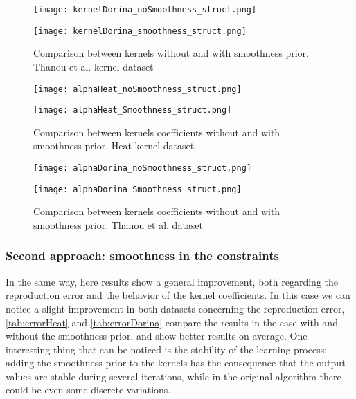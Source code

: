 \begin{figure}
  \begin{minipage}[c]{.5\textwidth}
    \centering
    \texttt{[image: kernelDorina\_noSmoothness\_struct.png]}
  \end{minipage}
  \begin{minipage}[c]{.5\textwidth}
    \centering
    \texttt{[image: kernelDorina\_smoothness\_struct.png]}
  \end{minipage}
  \caption{Comparison between kernels without and with smoothness prior. Thanou et al. kernel dataset}
  \label{fig:kernelDorina_struct}
\end{figure}

\begin{figure}[htbp]
  \centering
  \begin{minipage}[c]{.85\textwidth}
    \centering
    \texttt{[image: alphaHeat\_noSmoothness\_struct.png]}
  \end{minipage}
  \vspace{10mm}
  \begin{minipage}[c]{.85\textwidth}
    \centering
    \texttt{[image: alphaHeat\_Smoothness\_struct.png]}
  \end{minipage}
  \caption{Comparison between kernels coefficients without and with smoothness prior. Heat kernel   dataset}
  \label{fig:alphaHeat_struct}
\end{figure}

\begin{figure}[htbp]
  \centering
  \begin{minipage}[c]{.85\textwidth}
    \centering
    \texttt{[image: alphaDorina\_noSmoothness\_struct.png]}
  \end{minipage}
  \vspace{10mm}
  \begin{minipage}[c]{.85\textwidth}
    \centering
    \texttt{[image: alphaDorina\_Smoothness\_struct.png]}
  \end{minipage}
  \caption{Comparison between kernels coefficients without and with smoothness prior. Thanou et al.   dataset}
  \label{fig:alphaDorina_struct}
\end{figure}

\subsubsection{Second approach: smoothness in the constraints}
In the same way, here results show a general improvement, both regarding the reproduction error and the behavior of the kernel coefficients. In this case we can notice a slight improvement in both datasets concerning the reproduction error, \autoref{tab:errorHeat} and \autoref{tab:errorDorina} compare the results in the case with and without the smoothness prior, and show better results on average. One interesting thing that can be noticed is the stability of the learning process: adding the smoothness prior to the kernels has the consequence that the output values are stable during several iterations, while in the original algorithm there could be even some discrete variations.

